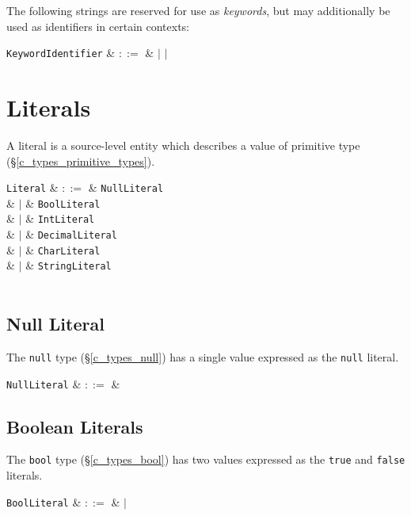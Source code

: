 \pagebreak

The following strings are reserved for use as {\em keywords}, but may additionally be used as identifiers in certain contexts:
\begin{syntax}
\verb+KeywordIdentifier+ & $::=$ &  $|$  $|$ \\
\end{syntax}



\section{Literals}

A \gls{literal} is a source-level entity which describes a value of primitive type (\S\ref{c_types_primitive_types}).

\begin{syntax}
\verb+Literal+ & $::=$ &  \verb+NullLiteral+ \\
  & $|$ & \verb+BoolLiteral+ \\
  & $|$ & \verb+IntLiteral+ \\
  & $|$ & \verb+DecimalLiteral+ \\
  & $|$ & \verb+CharLiteral+ \\
  & $|$ & \verb+StringLiteral+ \\
\\
\end{syntax}

\subsection{Null Literal}

The \lstinline{null} type (\S\ref{c_types_null}) has a single value expressed as the \lstinline{null} literal.

\begin{syntax}
  \verb+NullLiteral+ & $::=$ &  \\
\end{syntax}


\subsection{Boolean Literals}

The \lstinline{bool} type (\S\ref{c_types_bool}) has two values expressed as the \lstinline{true} and \lstinline{false} literals.

\begin{syntax}
  \verb+BoolLiteral+ & $::=$ &  $|$  \\
\end{syntax}


